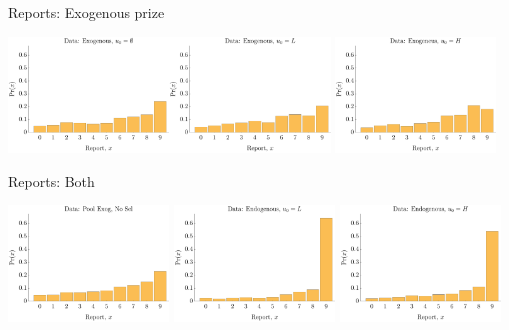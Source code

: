 \documentclass{beamer}
\begin{document}
\begin{frame}{Reports: Exogenous prize}
    \begin{center}
        \includegraphics[width=0.32\textwidth]{./ih/emp_hist_ex_none.pdf}\includegraphics[width=0.32\textwidth]{./ih/emp_hist_ex_L.pdf}
        \includegraphics[width=0.32\textwidth]{./ih/emp_hist_ex_H.pdf}
    \end{center}
\end{frame}

\begin{frame}{Reports: Both}
    \begin{center}
        \includegraphics[width=0.32\textwidth]{./ih/emp_hist_pool.pdf}
        \includegraphics[width=0.32\textwidth]{./ih/emp_hist_en_L.pdf}
        \includegraphics[width=0.32\textwidth]{./ih/emp_hist_en_H.pdf}
    \end{center}
\end{frame}
\end{document}

